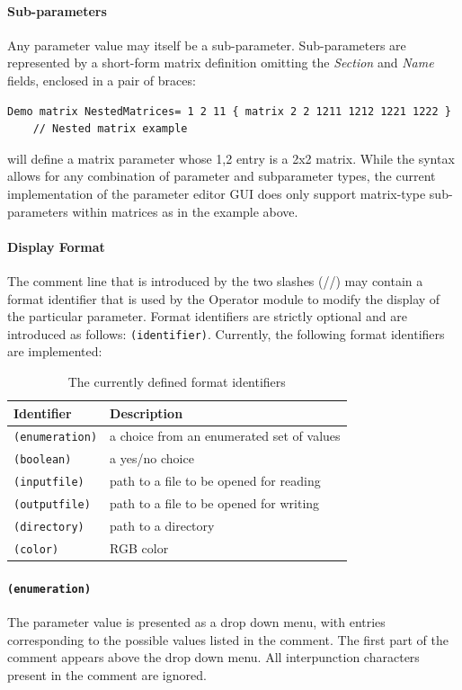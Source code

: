 \documentclass[letterpaper,oneside,12pt]{book}
\begin{document}
\paragraph{Sub-parameters} Any parameter value may itself be a sub-parameter.
Sub-parameters are represented by a short-form
matrix definition omitting the \textit{Section} and \textit{Name} fields, enclosed in
a pair of braces:
\begin{verbatim}
Demo matrix NestedMatrices= 1 2 11 { matrix 2 2 1211 1212 1221 1222 } 
    // Nested matrix example
\end{verbatim}
will define a matrix parameter whose 1,2 entry is a 2x2 matrix.
While the syntax allows for any combination of parameter and subparameter types,
the current implementation of the parameter editor GUI does only support matrix-type
sub-parameters within matrices as in the example above.

\paragraph{Display Format} The comment line that is introduced by the two 
slashes (//) may contain a format identifier that is used by the Operator module
to modify the display of the particular parameter. Format identifiers are
strictly optional and are introduced as follows: \texttt{(identifier)}.
Currently, the following format identifiers are implemented:

\begin{table}[ht]
 \centering
 \begin{tabular}{|l|l|}
  \hline
  \textbf{Identifier} & \textbf{Description}\\
  \hline
  \texttt{(enumeration)} & a choice from an enumerated set of values \\
  \texttt{(boolean)} & a yes/no choice \\
  \texttt{(inputfile)} & path to a file to be opened for reading \\
  \texttt{(outputfile)} & path to a file to be opened for writing \\
  \texttt{(directory)} & path to a directory \\
  \texttt{(color)} & RGB color \\
  \hline
 \end{tabular}
 \caption{The currently defined format identifiers}
\end{table}   

\paragraph{\texttt{(enumeration)}}
The parameter value is presented as a drop down menu, with entries corresponding to the
possible values listed in the comment. The first part of the comment appears above
the drop down menu. All interpunction characters present in the comment are ignored.
\end{document}
